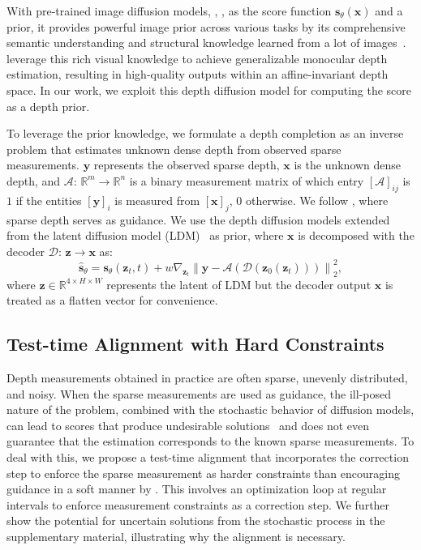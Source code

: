 With pre-trained image diffusion models, \eg, \citet{rombach2022highresolution}, as the score function $\mathbf{s}_{\theta}(\mathbf{x})$ and a prior, it provides 
powerful image prior across various tasks by its 
comprehensive semantic understanding and structural knowledge learned from a lot of images~\cite{wang2023exploiting, namekata2024emerdiff}.
\citet{ke2023repurposing} leverage this rich visual knowledge to achieve generalizable monocular depth estimation, resulting in high-quality outputs within an affine-invariant depth space. In our work, we exploit this depth diffusion model for computing the score as a depth prior.


\label{sec:problem_form}
To leverage the prior knowledge, we formulate
a depth completion as an inverse problem that estimates unknown dense depth from 
observed sparse measurements.
$\mathbf{y}$ represents the observed sparse depth, 
$\mathbf{x}$ is the unknown dense depth, and 
$\mathcal{A}{:}\,\mathbb{R}^m{\rightarrow}\mathbb{R}^n$ is a binary measurement matrix of which entry  $[\mathcal{A}]_{ij}$ is $1$ if the entities $[\mathbf{y}]_i$ is measured from $[\mathbf{x}]_j$, $0$ otherwise. 
We follow , where sparse depth serves as guidance.
We use the depth diffusion models \cite{ke2023repurposing, gui2024depthfm} extended from the latent diffusion model (LDM)~\cite{rombach2022highresolution} as prior, where
$\mathbf{x}$ is 
decomposed with the decoder $\mathcal{D}{:}\, \mathbf{z} \rightarrow \mathbf{x}$ as:
\begin{equation}
\label{eq:depth_guide_sampling}
\hat{\mathbf{s}}_{\theta}= \mathbf{s}_{\theta}(\mathbf{z}_t, t) + w {\nabla_{\mathbf{z}_t}}\left\| \mathbf{y} - \mathcal{A}\left(\mathcal{D}\left(\mathbf{z}_0\left(\mathbf{z}_t\right)\right)\right) \right\|_2^2,
\end{equation}
where $\mathbf{z}\in \mathbb{R}^{4\times H \times W}$ represents the latent of LDM but the decoder output $\mathbf{x}$ is treated as a flatten vector for convenience.

\subsection{Test-time Alignment with Hard Constraints}
\label{sec:opt_sampling}
Depth measurements obtained in practice are often sparse, unevenly distributed, and noisy. 
When the sparse measurements are used as guidance, the ill-posed nature of the problem, combined with the stochastic behavior of diffusion models, can lead to scores that produce undesirable solutions~\cite{kim2024regtext} and does not even guarantee that the estimation corresponds to the known sparse measurements. 
To deal with this, we propose a test-time alignment that incorporates the correction step 
to enforce the sparse measurement as harder constraints than encouraging guidance in a soft manner by .
This involves an optimization loop at regular intervals to enforce
measurement constraints as a correction step.
We further show the potential for uncertain solutions from the stochastic process in the supplementary material, illustrating why the alignment is necessary.

